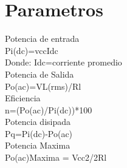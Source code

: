 \documentclass[12pt,a4paper]{article}
\begin{document}
 \section{Parametros}
 Potencia de entrada
 \\
 Pi(dc)=vccIdc
 \\
 Donde:
 Idc=corriente promedio
 \\
 Potencia de Salida
 \\
 Po(ac)=VL(rms)/Rl
 \\
 Eficiencia
 \\
 n=(Po(ac)/Pi(dc))*100
 \\
 Potencia disipada
 \\
 Pq=Pi(dc)-Po(ac)
 \\
 Potencia Maxima
 \\
 Po(ac)Maxima = Vcc2/2Rl
 
\end{document}

